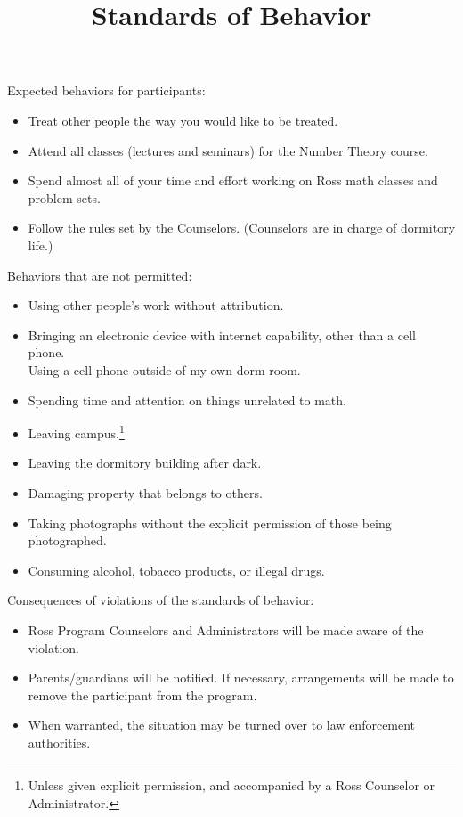 \documentclass{ross}
\title{Standards of Behavior}
\makeatletter
\newcommand\footnoteref[1]{\protected@xdef\@thefnmark{\ref{#1}}\@footnotemark}
\makeatother
\begin{document}
\maketitle
Expected behaviors for participants:
\begin{itemize}
\item Treat other people the way you would like to be treated.
\item Attend all classes (lectures and seminars) for the Number Theory course.
\item Spend almost all of your time and effort working on Ross math classes and problem sets.
\item Follow the rules set by the Counselors. (Counselors are in charge of dormitory life.)
\end{itemize}

Behaviors that are not permitted:
\begin{itemize}
\item Using other people's work without attribution.
\item Bringing an electronic device with internet capability, other than a cell phone.\\
Using a cell phone outside of my own dorm room.
\item Spending time and attention on things unrelated to math.
\item Leaving campus.\footnote{\label{counselors}Unless given explicit permission, and accompanied by a Ross Counselor or Administrator.}
\item Leaving the dormitory building after dark.\footnoteref{counselors}
\item Damaging property that belongs to others.
\item Taking photographs without the explicit permission of those being photographed.
\item Consuming alcohol, tobacco products, or illegal drugs.
\end{itemize}

Consequences of violations of the standards of behavior:
\begin{itemize}
\item Ross Program Counselors and Administrators will be made aware of
  the violation.
\item Parents/guardians will be notified. If necessary, arrangements
  will be made to remove the participant from the program.
\item When warranted, the situation may be turned over to law
  enforcement authorities.
\end{itemize}
\end{document}
